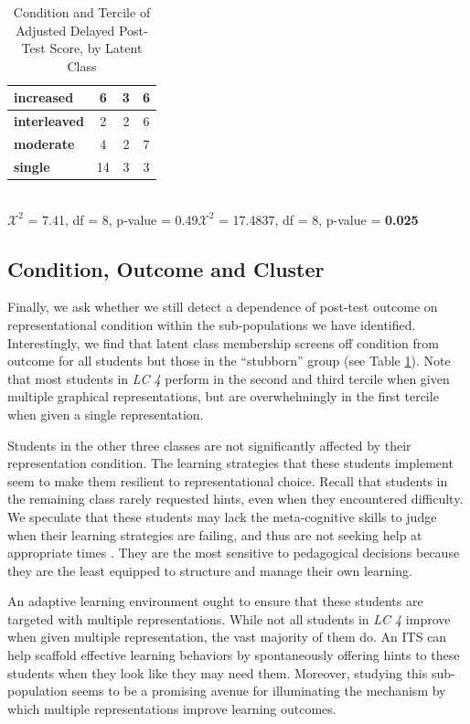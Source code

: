 \documentclass{edm_template}
\begin{document}
\begin{table}[htbp]
\begin{center}
\begin{tabular}{|l || c | c | c |}
  \textbf{increased}&    6&  3&  6 \\ \hline
  \textbf{interleaved}&  2&  2&  6 \\ \hline
  \textbf{moderate}&     4&  2& 7 \\ \hline
  \textbf{single}&       14&  3&  3 \\ \hline
 \end{tabular}
\\$\mathcal{X}^2$ = 7.41, df = 8, p-value = 0.49\hspace{15pt}$\mathcal{X}^2$ = 17.4837, df = 8, p-value = {\bf 0.025}
\end{center}
\caption{Condition and Tercile of Adjusted Delayed Post-Test Score, by Latent Class}
\label{tab:exp-and-score-by-lc}
\end{table}


\subsection{Condition, Outcome and Cluster}

Finally, we ask whether we still detect a dependence of post-test outcome on representational condition within the sub-populations we have identified. Interestingly, we find that latent class membership screens off condition from outcome for all students but those in the ``stubborn'' group (see Table \ref{tab:exp-and-score-by-lc}).  Note that most students in \emph{LC 4} perform in the second and third tercile when given multiple graphical representations, but are overwhelmingly in the first tercile when given a single representation. 

Students in the other three classes are not significantly affected by their representation condition. The learning strategies that these students implement seem to make them resilient to representational choice. Recall that students in the remaining class rarely requested hints, even when they encountered difficulty. We speculate that these students may lack the meta-cognitive skills to judge when their learning strategies are failing, and thus are not seeking help at appropriate times \cite{Aleven2006}. They are the most sensitive to pedagogical decisions because they are the least equipped to structure and manage their own learning. 

An adaptive learning environment ought to ensure that these students are targeted with multiple representations. While not all students in \emph{LC 4} improve when given multiple representation, the vast majority of them do. An ITS can help scaffold effective learning behaviors by spontaneously offering hints to these students when they look like they may need them. Moreover, studying this sub-population seems to be a promising avenue for illuminating the mechanism by which multiple representations improve learning outcomes. 
\end{document}
